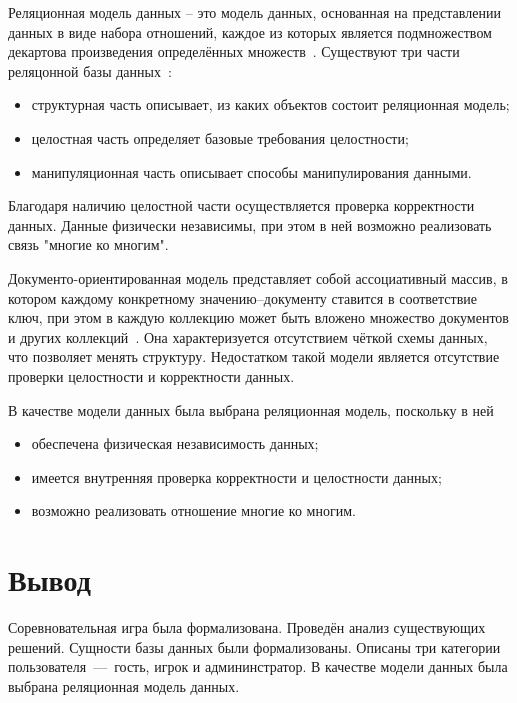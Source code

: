 Реляционная модель данных – это модель данных, основанная на 
представлении данных в виде набора отношений, каждое из которых является 
подмножеством декартова произведения определённых множеств~\cite{karpova}. Существуют три части реляцонной базы данных~\cite{relationdb}:
\begin{itemize}
	\item структурная часть описывает, из каких объектов состоит реляционная модель;
	\item целостная часть определяет базовые требования целостности;
	\item манипуляционная часть описывает способы манипулирования данными.
\end{itemize}
Благодаря наличию целостной части осуществляется проверка корректности данных. Данные физически независимы, при этом в ней возможно реализовать связь "многие ко многим".

Документо-ориентированная модель представляет собой ассоциативный массив, в котором каждому конкретному значению--документу ставится в соответствие ключ, при этом в каждую коллекцию может быть вложено множество документов и других коллекций~\cite{documentoriented}. Она характеризуется отсутствием чёткой схемы данных, что позволяет менять структуру. Недостатком такой модели является отсутствие проверки целостности и корректности данных.

В качестве модели данных была выбрана реляционная модель, поскольку в ней
\begin{itemize}
	\item обеспечена физическая независимость данных;
	\item имеется внутренняя проверка корректности и целостности данных;
	\item возможно реализовать отношение многие ко многим.
\end{itemize} 

\section*{Вывод}

Соревновательная игра была формализована. Проведён анализ существующих решений. Сущности базы данных были формализованы. Описаны три категории пользователя~---~гость, игрок и админинстратор. В качестве модели данных была выбрана реляционная модель данных. 

\clearpage
